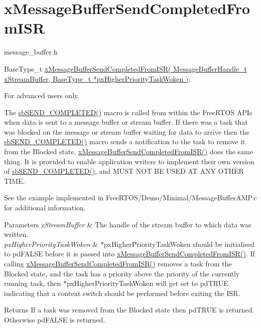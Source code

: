 \hypertarget{group__xMessageBufferSendCompletedFromISR}{}\section{x\+Message\+Buffer\+Send\+Completed\+From\+I\+SR}
\label{group__xMessageBufferSendCompletedFromISR}
message\+\_\+buffer.\+h


\begin{DoxyPre}
BaseType\_t \hyperlink{message__buffer_8h_a45918d12bf530cb2b4bf21c0936460a9}{xMessageBufferSendCompletedFromISR( MessageBufferHandle\_t xStreamBuffer, BaseType\_t *pxHigherPriorityTaskWoken )};
\end{DoxyPre}


For advanced users only.

The \hyperlink{stream__buffer_8c_aa75273dfbcd92710254df0165ae1da5d}{sb\+S\+E\+N\+D\+\_\+\+C\+O\+M\+P\+L\+E\+T\+E\+D()} macro is called from within the Free\+R\+T\+OS A\+P\+Is when data is sent to a message buffer or stream buffer. If there was a task that was blocked on the message or stream buffer waiting for data to arrive then the \hyperlink{stream__buffer_8c_aa75273dfbcd92710254df0165ae1da5d}{sb\+S\+E\+N\+D\+\_\+\+C\+O\+M\+P\+L\+E\+T\+E\+D()} macro sends a notification to the task to remove it from the Blocked state. \hyperlink{message__buffer_8h_a45918d12bf530cb2b4bf21c0936460a9}{x\+Message\+Buffer\+Send\+Completed\+From\+I\+S\+R()} does the same thing. It is provided to enable application writers to implement their own version of \hyperlink{stream__buffer_8c_aa75273dfbcd92710254df0165ae1da5d}{sb\+S\+E\+N\+D\+\_\+\+C\+O\+M\+P\+L\+E\+T\+E\+D()}, and M\+U\+ST N\+OT BE U\+S\+ED AT A\+NY O\+T\+H\+ER T\+I\+ME.

See the example implemented in Free\+R\+T\+O\+S/\+Demo/\+Minimal/\+Message\+Buffer\+A\+M\+P.\+c for additional information.


\begin{DoxyParams}{Parameters}
{\em x\+Stream\+Buffer} & The handle of the stream buffer to which data was written.\\
\hline
{\em px\+Higher\+Priority\+Task\+Woken} & $\ast$px\+Higher\+Priority\+Task\+Woken should be initialised to pd\+F\+A\+L\+SE before it is passed into \hyperlink{message__buffer_8h_a45918d12bf530cb2b4bf21c0936460a9}{x\+Message\+Buffer\+Send\+Completed\+From\+I\+S\+R()}. If calling \hyperlink{message__buffer_8h_a45918d12bf530cb2b4bf21c0936460a9}{x\+Message\+Buffer\+Send\+Completed\+From\+I\+S\+R()} removes a task from the Blocked state, and the task has a priority above the priority of the currently running task, then $\ast$px\+Higher\+Priority\+Task\+Woken will get set to pd\+T\+R\+UE indicating that a context switch should be performed before exiting the I\+SR.\\
\hline
\end{DoxyParams}
\begin{DoxyReturn}{Returns}
If a task was removed from the Blocked state then pd\+T\+R\+UE is returned. Otherwise pd\+F\+A\+L\+SE is returned. 
\end{DoxyReturn}
